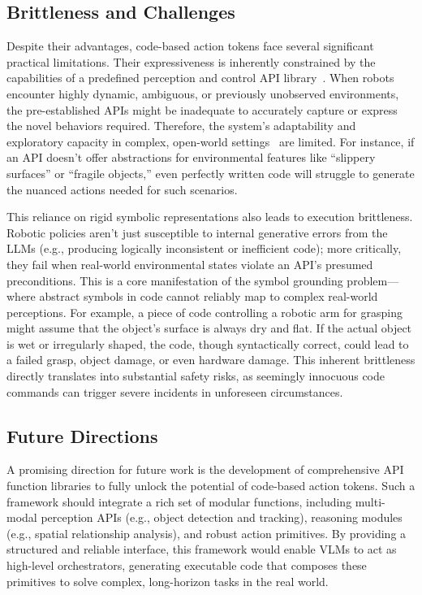 \documentclass[10pt, a4paper, logo, copyright]{googledeepmind} %
\begin{document}

\subsection{Brittleness and Challenges}
Despite their advantages, code-based action tokens face several significant practical limitations. Their expressiveness is inherently constrained by the capabilities of a predefined perception and control API library~\cite{liang2023code}. When robots encounter highly dynamic, ambiguous, or previously unobserved environments, the pre-established APIs might be inadequate to accurately capture or express the novel behaviors required. Therefore, the system's adaptability and exploratory capacity in complex, open-world settings~\cite{Singh2022ProgPromptGS} are limited. For instance, if an API doesn't offer abstractions for environmental features like ``slippery surfaces'' or ``fragile objects,'' even perfectly written code will struggle to generate the nuanced actions needed for such scenarios.

This reliance on rigid symbolic representations also leads to execution brittleness. Robotic policies aren't just susceptible to internal generative errors from the LLMs (e.g., producing logically inconsistent or inefficient code); more critically, they fail when real-world environmental states violate an API's presumed preconditions. This is a core manifestation of the symbol grounding problem---where abstract symbols in code cannot reliably map to complex real-world perceptions. For example, a piece of code controlling a robotic arm for grasping might assume that the object's surface is always dry and flat. If the actual object is wet or irregularly shaped, the code, though syntactically correct, could lead to a failed grasp, object damage, or even hardware damage. This inherent brittleness directly translates into substantial safety risks, as seemingly innocuous code commands can trigger severe incidents in unforeseen circumstances. 



\subsection{Future Directions}
A promising direction for future work is the development of comprehensive API function libraries to fully unlock the potential of code-based action tokens. Such a framework should integrate a rich set of modular functions, including multi-modal perception APIs (e.g., object detection and tracking), reasoning modules (e.g., spatial relationship analysis), and robust action primitives. By providing a structured and reliable interface, this framework would enable VLMs to act as high-level orchestrators, generating executable code that composes these primitives to solve complex, long-horizon tasks in the real world.
\end{document}
